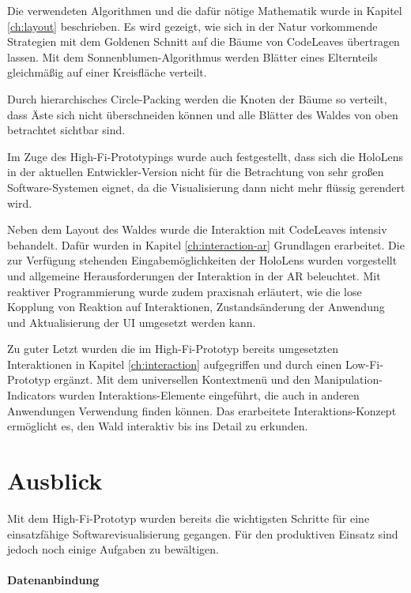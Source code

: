 Die verwendeten Algorithmen und die dafür nötige Mathematik wurde in Kapitel \ref{ch:layout} beschrieben. Es wird gezeigt, wie sich in der Natur vorkommende Strategien mit dem Goldenen Schnitt auf die Bäume von CodeLeaves übertragen lassen. Mit dem Sonnenblumen-Algorithmus werden Blätter eines Elternteils gleichmäßig auf einer Kreisfläche verteilt.

Durch hierarchisches Circle-Packing werden die Knoten der Bäume so verteilt, dass Äste sich nicht überschneiden können und alle Blätter des Waldes von oben betrachtet sichtbar sind.

Im Zuge des High-Fi-Prototypings wurde auch festgestellt, dass sich die HoloLens in der aktuellen Entwickler-Version nicht für die Betrachtung von sehr großen Software-Systemen eignet, da die Visualisierung dann nicht mehr flüssig gerendert wird.

Neben dem Layout des Waldes wurde die Interaktion mit CodeLeaves intensiv behandelt. Dafür wurden in Kapitel \ref{ch:interaction-ar} Grundlagen erarbeitet. Die zur Verfügung stehenden Eingabemöglichkeiten der HoloLens wurden vorgestellt und allgemeine Herausforderungen der Interaktion in der AR beleuchtet. Mit reaktiver Programmierung wurde zudem praxisnah erläutert, wie die lose Kopplung von Reaktion auf Interaktionen, Zustandsänderung der Anwendung und Aktualisierung der UI umgesetzt werden kann.

Zu guter Letzt wurden die im High-Fi-Prototyp bereits umgesetzten Interaktionen in Kapitel \ref{ch:interaction} aufgegriffen und durch einen Low-Fi-Prototyp ergänzt. Mit dem universellen Kontextmenü und den Manipulation-Indicators wurden Interaktions-Elemente eingeführt, die auch in anderen Anwendungen Verwendung finden können. Das erarbeitete Interaktions-Konzept ermöglicht es, den Wald interaktiv bis ins Detail zu erkunden.

\section{Ausblick}

Mit dem High-Fi-Prototyp wurden bereits die wichtigsten Schritte für eine einsatzfähige Softwarevisualisierung gegangen. Für den produktiven Einsatz sind jedoch noch einige Aufgaben zu bewältigen.

\paragraph{Datenanbindung}

